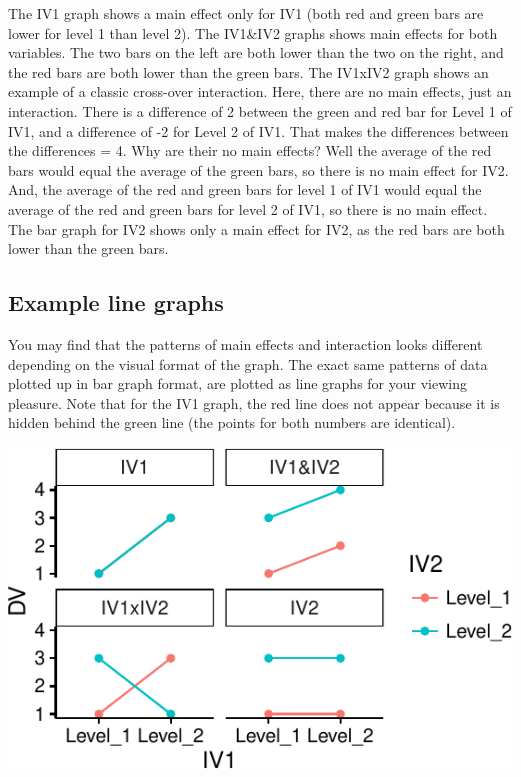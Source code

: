 The IV1 graph shows a main effect only for IV1 (both red and green bars
are lower for level 1 than level 2). The IV1\&IV2 graphs shows main
effects for both variables. The two bars on the left are both lower than
the two on the right, and the red bars are both lower than the green
bars. The IV1xIV2 graph shows an example of a classic cross-over
interaction. Here, there are no main effects, just an interaction. There
is a difference of 2 between the green and red bar for Level 1 of IV1,
and a difference of -2 for Level 2 of IV1. That makes the differences
between the differences = 4. Why are their no main effects? Well the
average of the red bars would equal the average of the green bars, so
there is no main effect for IV2. And, the average of the red and green
bars for level 1 of IV1 would equal the average of the red and green
bars for level 2 of IV1, so there is no main effect. The bar graph for
IV2 shows only a main effect for IV2, as the red bars are both lower
than the green bars.

\subsection{Example line graphs}\label{example-line-graphs}

You may find that the patterns of main effects and interaction looks
different depending on the visual format of the graph. The exact same
patterns of data plotted up in bar graph format, are plotted as line
graphs for your viewing pleasure. Note that for the IV1 graph, the red
line does not appear because it is hidden behind the green line (the
points for both numbers are identical).

\includegraphics{Factorial_files/figure-latex/unnamed-chunk-14-1}

